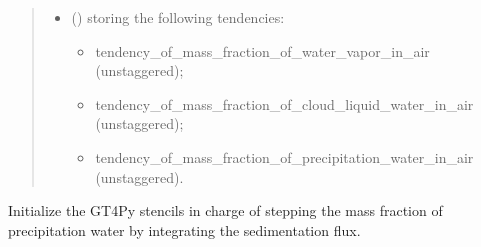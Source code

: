 \documentclass[letterpaper,10pt,english]{sphinxmanual}
\begin{document}
\begin{fulllineitems}
\begin{fulllineitems}
\begin{quote}
\begin{description}
\begin{itemize}
\begin{itemize}
\end{itemize}


\item {} 
 () \textendash{} 
{\hyperref[\detokenize{api:tasmania.storages.grid_data.GridData}]{}} storing the following tendencies:
\begin{itemize}
\item {} 
tendency\_of\_mass\_fraction\_of\_water\_vapor\_in\_air (unstaggered);

\item {} 
tendency\_of\_mass\_fraction\_of\_cloud\_liquid\_water\_in\_air (unstaggered);

\item {} 
tendency\_of\_mass\_fraction\_of\_precipitation\_water\_in\_air (unstaggered).

\end{itemize}


\end{itemize}

\end{description}\end{quote}

\end{fulllineitems}


\begin{fulllineitems}
\label{\detokenize{api:tasmania.dycore.prognostic_isentropic_centered.PrognosticIsentropicCentered._stencils_stepping_by_integrating_sedimentation_flux_initialize}}
Initialize the GT4Py stencils in charge of stepping the mass fraction of precipitation water by
integrating the sedimentation flux.

\end{fulllineitems}



\end{fulllineitems}
\end{document}
